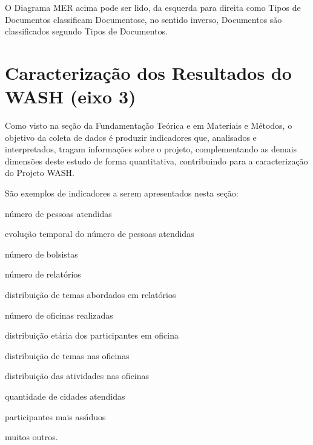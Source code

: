 \documentclass[
12pt,		%
openright,	%
twoside,  %
a4paper,			%
chapter=TITLE,		%
english,			%
french,				%
spanish,			%
brazil				%
]{USPSC-classe/USPSC}
\begin{document}

O Diagrama MER acima pode ser lido, da esquerda para direita como \textquotedbl Tipos de Documentos classificam Documentos\textquotedbl  e, no sentido inverso, \textquotedbl Documentos s\~ao classificados segundo Tipos de Documentos\textquotedbl .


\section[Caracteriza\c{c}\~ao dos Resultados do WASH (eixo 3)]{Caracteriza\c{c}\~ao dos Resultados do WASH (eixo 3)}\label{Caracteriza\c{c}\~ao dos Resultados do WASH (eixo 3)}
Como visto na se\c{c}\~ao da Fundamenta\c{c}\~ao Te\'orica e em Materiais e M\'etodos, o objetivo da coleta de dados \'e produzir indicadores que, analisados e interpretados, tragam informa\c{c}\~oes sobre o projeto, complementando as demais dimens\~oes deste estudo de forma quantitativa, contribuindo para a caracteriza\c{c}\~ao do Projeto WASH.


S\~ao exemplos de indicadores a serem apresentados nesta se\c{c}\~ao:



\begin{alineas}
\item n\'umero de pessoas atendidas
\item evolu\c{c}\~ao temporal do n\'umero de pessoas atendidas
\item n\'umero de bolsistas
\item n\'umero de relat\'orios
\item distribui\c{c}\~ao de temas abordados em relat\'orios
\item n\'umero de oficinas realizadas
\item distribui\c{c}\~ao et\'aria dos participantes em oficina
\item distribui\c{c}\~ao de temas nas oficinas
\item distribui\c{c}\~ao das atividades nas oficinas
\item quantidade de cidades atendidas
\item participantes mais ass\'{\i}duos
\item muitos outros.
\end{alineas}
\end{document}
